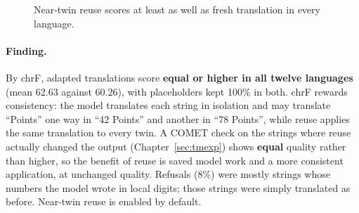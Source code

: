 \begin{figure}[H]
\centering
{}
\caption[Near-twin reuse per language]{Near-twin reuse scores at least as well as fresh translation in every language.}
\label{fig:twins}
\end{figure}

\paragraph{Finding.} By chrF, adapted translations score \textbf{equal or higher in all twelve languages} (mean 62.63
against 60.26), with placeholders kept 100\% in both. chrF rewards consistency: the model translates each string in
isolation and may translate ``Points'' one way in ``42 Points'' and another in ``78 Points'', while reuse applies the same
translation to every twin. A COMET check on the strings where reuse actually changed the output
(Chapter~\ref{sec:tmexp}) shows \textbf{equal} quality rather than higher, so the benefit of reuse is saved model work
and a more consistent application, at unchanged quality. Refusals
(8\%) were mostly strings whose numbers the model wrote in local digits; those strings were simply translated as before.
Near-twin reuse is enabled by default.
